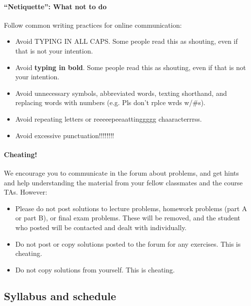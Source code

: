 \documentclass[pdftex, brazil, 12pt, twoside]{article}
\begin{document}
\paragraph{``Netiquette'': What not to do}
Follow common writing practices for online communication:

\begin{itemize}[noitemsep]
\item Avoid TYPING IN ALL CAPS. Some people read this as shouting, even if
  that is not your intention.
\item Avoid \textbf{typing in bold}. Some people read this as shouting,
  even if that is not your intention.
\item Avoid unnecessary symbols, abbreviated words, texting shorthand,
  and replacing words with numbers (e.g. Pls don't rplce wrds w/\#s).
\item Avoid repeating letters or reeeeepeeaattinggggg chaaracterrrss.
\item Avoid excessive punctuation!!!!!!!!
\end{itemize}

\paragraph{Cheating!}
We encourage you to communicate in the forum about problems, and get hints
and help understanding the material from your fellow classmates and the
course TAs. However:

\begin{itemize}[noitemsep]
\item Please do not post solutions to lecture problems, homework
  problems (part A or part B), or final exam problems. These will be
  removed, and the student who posted will be contacted and dealt
  with individually.
\item Do not post or copy solutions posted to the forum for any exercises.
  This is cheating.
\item Do not copy solutions from yourself. This is cheating.
\end{itemize}


\subsection{Syllabus and schedule}
\label{gs-syllabus}
\end{document}
